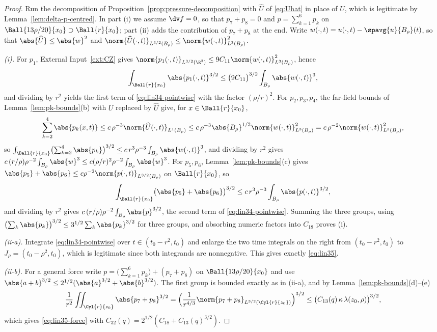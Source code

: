 \documentclass[11pt,reqno]{amsart}
\begin{document}
\begin{proof}
Run the decomposition of Proposition~\ref{prop:pressure-decomposition} with
$\widehat U$ of \eqref{eq:Uhat} in place of $U$, which is legitimate by
Lemma~\ref{lem:delta-p-centred}. In part (i) we assume $\dv f=0$, so that
$p_{7}+p_{8}=0$ and $p=\sum_{k=1}^{6}p_{k}$ on
$\Ball{13\rho/20}{x_{0}}\supset\Ball{r}{x_{0}}$; part (ii) adds the
contribution of $p_{7}+p_{8}$ at the end. Write
$w(\cdot,t)=u(\cdot,t)-\spavg{u}{B_{\rho}}(t)$, so that
$\abs{\widehat U}\le\abs{w}^{2}$ and
$\norm{\widehat U(\cdot,t)}_{L^{3/2}(B_{\rho})}\le\norm{w(\cdot,t)}^{2}_{L^{3}(B_{\rho})}$.

\emph{(i).} For $p_{1}$, External Input~\ref{ext:CZ} gives
$\norm{p_{1}(\cdot,t)}_{L^{3/2}(\R^{3})}\le9C_{11}\norm{w(\cdot,t)}^{2}_{L^{3}(B_{\rho})}$,
hence
\[
  \int_{\Ball{r}{x_{0}}}\abs{p_{1}(\cdot,t)}^{3/2}
  \le\bigl(9C_{11}\bigr)^{3/2}\int_{B_{\rho}}\abs{w(\cdot,t)}^{3},
\]
and dividing by $r^{2}$ yields the first term of \eqref{eq:lin34-pointwise}
with the factor $(\rho/r)^{2}$. For $p_{2},p_{3},p_{4}$, the far-field bounds of
Lemma~\ref{lem:pk-bounds}(b) with $U$ replaced by $\widehat U$ give, for
$x\in\Ball{r}{x_{0}}$,
\[
  \sum_{k=2}^{4}\abs{p_{k}(x,t)}
  \le c\,\rho^{-3}\norm{\widehat U(\cdot,t)}_{L^{1}(B_{\rho})}
  \le c\,\rho^{-3}\abs{B_{\rho}}^{1/3}\norm{w(\cdot,t)}^{2}_{L^{3}(B_{\rho})}
  = c\,\rho^{-2}\norm{w(\cdot,t)}^{2}_{L^{3}(B_{\rho})} ,
\]
so
$\int_{\Ball{r}{x_{0}}}\bigl(\sum_{k=2}^{4}\abs{p_{k}}\bigr)^{3/2}
 \le c\,r^{3}\rho^{-3}\int_{B_{\rho}}\abs{w(\cdot,t)}^{3}$, and dividing by
$r^{2}$ gives $c\,(r/\rho)\rho^{-2}\int_{B_{\rho}}\abs{w}^{3}
\le c(\rho/r)^{2}\rho^{-2}\int_{B_{\rho}}\abs{w}^{3}$. For $p_{5},p_{6}$,
Lemma~\ref{lem:pk-bounds}(c) gives
$\abs{p_{5}}+\abs{p_{6}}\le c\rho^{-2}\norm{p(\cdot,t)}_{L^{3/2}(B_{\rho})}$ on
$\Ball{r}{x_{0}}$, so
\[
  \int_{\Ball{r}{x_{0}}}\bigl(\abs{p_{5}}+\abs{p_{6}}\bigr)^{3/2}
  \le c\,r^{3}\rho^{-3}\int_{B_{\rho}}\abs{p(\cdot,t)}^{3/2},
\]
and dividing by $r^{2}$ gives $c\,(r/\rho)\rho^{-2}\int_{B_{\rho}}\abs{p}^{3/2}$,
the second term of \eqref{eq:lin34-pointwise}. Summing the three groups, using
$\bigl(\sum_{k}\abs{p_{k}}\bigr)^{3/2}\le3^{1/2}\sum_{k}\abs{p_{k}}^{3/2}$ for
three groups, and absorbing numeric factors into $C_{18}$ proves (i).

\emph{(ii-a).} Integrate \eqref{eq:lin34-pointwise} over
$t\in(t_{0}-r^{2},t_{0})$ and enlarge the two time integrals on the right from
$(t_{0}-r^{2},t_{0})$ to $J_{\rho}=(t_{0}-\rho^{2},t_{0})$, which is legitimate
since both integrands are nonnegative. This gives exactly \eqref{eq:lin35}.

\emph{(ii-b).} For a general force write $p=\bigl(\sum_{k=1}^{6}p_{k}\bigr)
+(p_{7}+p_{8})$ on $\Ball{13\rho/20}{x_{0}}$ and use
$\abs{a+b}^{3/2}\le2^{1/2}(\abs{a}^{3/2}+\abs{b}^{3/2})$. The first group is
bounded exactly as in (ii-a), and by Lemma~\ref{lem:pk-bounds}(d)--(e)
\[
  \frac1{r^{2}}\iint_{\Cyl{r}{z_{0}}}\abs{p_{7}+p_{8}}^{3/2}
  =\Bigl(\frac{1}{r^{4/3}}\norm{p_{7}+p_{8}}_{L^{3/2}(\Cyl{r}{z_{0}})}\Bigr)^{3/2}
  \le\bigl(C_{13}(q)\,\kappa\,\lambda(z_{0},\rho)\bigr)^{3/2},
\]
which gives \eqref{eq:lin35-force} with
$C_{32}(q)=2^{1/2}(C_{18}+C_{13}(q)^{3/2})$.
\end{proof}
\end{document}
